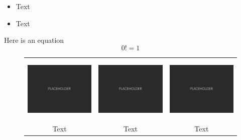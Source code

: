 \begin{itemize}
	\item Text
	\item Text
\end{itemize}

Here is an equation
%
\begin{equation}
0! = 1
\end{equation}

\begin{figure}
    \begin{tabular}{ccc}
        \includegraphics[height=1.25in]{fig/placeholder.pdf} &
        \includegraphics[height=1.25in]{fig/placeholder.pdf} &
        \includegraphics[height=1.25in]{fig/placeholder.pdf} \\
        \footnotesize{Text} & \footnotesize{Text} & \footnotesize{Text}
    \end{tabular}
\end{figure}
